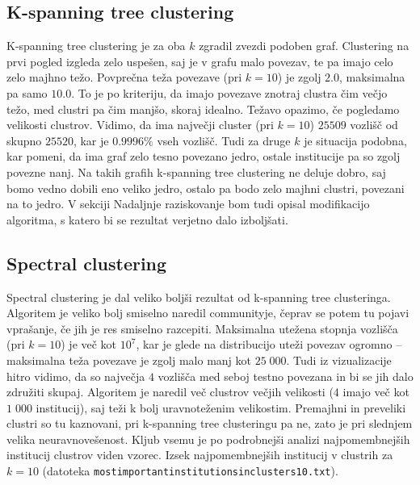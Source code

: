 \documentclass[a4paper,12pt]{article}
\begin{document}
	\subsection{K-spanning tree clustering}
	K-spanning tree clustering je za oba $k$ zgradil zvezdi podoben graf. Clustering na prvi pogled izgleda zelo uspešen, saj je v grafu malo povezav, te pa imajo celo zelo majhno težo. Povprečna teža povezave (pri $k = 10$) je zgolj $2.0$, maksimalna pa samo $10.0$. To je po kriteriju, da imajo povezave znotraj clustra čim večjo težo, med clustri pa čim manjšo, skoraj idealno.
	Težavo opazimo, če pogledamo velikosti clustrov. Vidimo, da ima največji cluster (pri $k = 10$) $25509$ vozlišč od skupno $25520$, kar je $0.9996\%$ vseh vozlišč. Tudi za druge $k$ je situacija podobna, kar pomeni, da ima graf zelo tesno povezano jedro, ostale institucije pa so zgolj povezne nanj. Na takih grafih k-spanning tree clustering ne deluje dobro, saj bomo vedno dobili eno veliko jedro, ostalo pa bodo zelo majhni clustri, povezani na to jedro. V sekciji Nadaljnje raziskovanje bom tudi opisal modifikacijo algoritma, s katero bi se rezultat verjetno dalo izboljšati.
	
	\subsection{Spectral clustering}
	Spectral clustering je dal veliko boljši rezultat od k-spanning tree clusteringa. Algoritem je veliko bolj smiselno naredil communityje, čeprav se potem tu pojavi vprašanje, če jih je res smiselno razcepiti. Maksimalna utežena stopnja vozlišča (pri $k=10$) je več kot $10^7$, kar je glede na distribucijo uteži povezav ogromno -- maksimalna teža povezave je zgolj malo manj kot $25\;000$. Tudi iz vizualizacije hitro vidimo, da so največja $4$ vozlišča med seboj testno povezana in bi se jih dalo združiti skupaj. Algoritem je naredil več clustrov večjih velikosti ($4$ imajo več kot $1\;000$ institucij), saj teži k bolj uravnoteženim velikostim. Premajhni in preveliki clustri so tu kaznovani, pri k-spanning tree clusteringu pa ne, zato je pri slednjem velika neuravnovešenost. Kljub vsemu je po podrobnejši analizi najpomembnejših institucij clustrov viden vzorec. Izsek najpomembnejših institucij v clustrih za $k=10$ (datoteka \texttt{most\textunderscore important\textunderscore institutions\textunderscore in\textunderscore clusters\textunderscore 10.txt}).
	
	\hspace{1cm}
	
\end{document}
